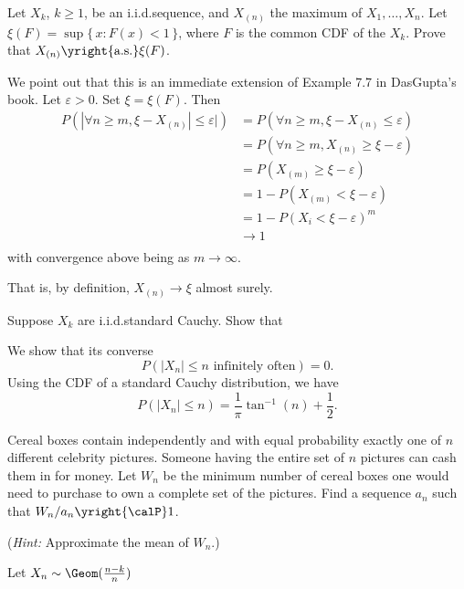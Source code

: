\begin{problem}
  Let \(X_k\), \(k\geq 1\), be an i.i.d.\@ sequence, and \(X_{(n)}\) the
  maximum of \(X_1,\dotsc,X_n\). Let \(\xi(F)=\sup\{\,x:F(x)<1\,\}\), where
  \(F\) is the common CDF of the \(X_k\). Prove that
  \(X_{(n)}\yright{\text{a.s.}}\xi(F)\).
\end{problem}
\begin{solution}
  We point out that this is an immediate extension of Example 7.7 in
  DasGupta's book. Let $\varepsilon >0$. Set $\xi = \xi(F)$. Then
  \begin{align*}
    P(|\forall n \geq m, \xi - X_{(n)}| \leq \varepsilon|)
    &= P(\forall n \geq m, \xi - X_{(n)} \leq \varepsilon)\\
    &= P(\forall n \geq m, X_{(n)} \geq \xi - \varepsilon )\\
    &= P(X_{(m)} \geq \xi - \varepsilon )\\
    &= 1- P(X_{(m)} < \xi - \varepsilon )\\
    &= 1- P(X_i < \xi - \varepsilon)^m\\
    &\to 1\\
  \end{align*}
  with convergence above being as $m \to \infty$.

  That is, by definition, $X_{(n)} \to \xi$ almost surely.
\end{solution}
\newpage

\begin{problem}[DasGupta 7.14 (a)]
  Suppose \(X_k\) are i.i.d.\@ standard Cauchy. Show that
\end{problem}
\begin{solution}
  We show that its converse
  \[
    P(\text{\(|X_n|\leq n\) infinitely often})=0.
  \]
  Using the CDF of a standard Cauchy distribution, we have
  \[
    P(|X_n|\leq n)=\frac{1}{\pi}\tan^{-1}(n)+\frac{1}{2}.
  \]
\end{solution}
\newpage

\begin{problem}
  Cereal boxes contain independently and with equal probability exactly one
  of \(n\) different celebrity pictures. Someone having the entire set of
  \(n\) pictures can cash them in for money. Let \(W_n\) be the minimum
  number of cereal boxes one would need to purchase to own a complete set
  of the pictures. Find a sequence \(a_n\) such that
  \(W_n/a_n\yright{\calP} 1\).

  \noindent (\emph{Hint:} Approximate the mean of \(W_n\).)
\end{problem}
\begin{solution}
  Let \(X_n\sim\Geom(\frac{n-k}{n})\)
\end{solution}
\newpage

